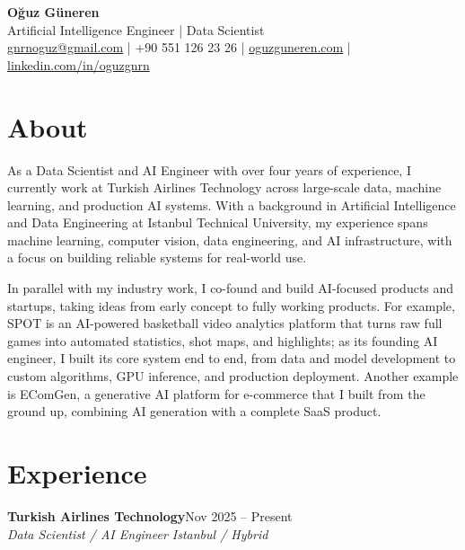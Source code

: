 \documentclass[a4paper,10pt]{article}
\newcommand{\entry}[3]{
    \textbf{#1}\hfill #2\\[-1pt]
    \textit{#3}\par
}
\begin{document}

\begin{center}
{\LARGE\bfseries Oğuz Güneren}\\[1pt]
Artificial Intelligence Engineer | Data Scientist\\[2pt]
\href{mailto:gnrnoguz@gmail.com}{gnrnoguz@gmail.com}
\enspace|\enspace
+90 551 126 23 26
\enspace|\enspace
\href{https://www.oguzguneren.com}{oguzguneren.com}
\enspace|\enspace
\href{https://www.linkedin.com/in/oguzgnrn}{linkedin.com/in/oguzgnrn}
\end{center}

\section{About}
\begin{center}
{\small
As a Data Scientist and AI Engineer with over four years of experience, I currently work at Turkish Airlines Technology across large-scale data, machine learning, and production AI systems. With a background in Artificial Intelligence and Data Engineering at Istanbul Technical University, my experience spans machine learning, computer vision, data engineering, and AI infrastructure, with a focus on building reliable systems for real-world use.

\vspace{1pt}

In parallel with my industry work, I co-found and build AI-focused products and startups, taking ideas from early concept to fully working products. For example, SPOT is an AI-powered basketball video analytics platform that turns raw full games into automated statistics, shot maps, and highlights; as its founding AI engineer, I built its core system end to end,  from data and model development to custom algorithms, GPU inference, and production deployment. Another example is EComGen, a generative AI platform for e-commerce that I built from the ground up, combining AI generation with a complete SaaS product.
}
\end{center}

\section{Experience}

\entry
{Turkish Airlines Technology}
{Nov 2025 -- Present}
{Data Scientist / AI Engineer \textperiodcentered{} Istanbul / Hybrid}
\end{document}
